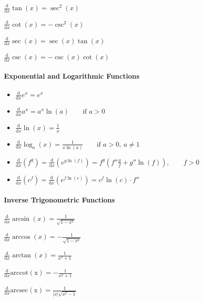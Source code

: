 $
\frac{\mathrm{d}}{\mathrm{d}x}\tan(x)=\sec^2(x)
$



$
\frac{\mathrm{d}}{\mathrm{d}x}\cot(x)=-\csc^2(x)
$



$
\frac{\mathrm{d}}{\mathrm{d}x}\sec(x)=\sec(x)\tan(x)
$



$
\frac{\mathrm{d}}{\mathrm{d}x}\csc(x)=-\csc(x)\cot(x)
$
\paragraph{Exponential and Logarithmic Functions}



\begin{itemize}
    \item $\frac{\mathrm{d}}{\mathrm{d}x}e^x=e^x$
    \item $\frac{\mathrm{d}}{\mathrm{d}x}a^x=a^x\ln(a)\qquad\text{if }a>0$
    \item $\frac{\mathrm{d}}{\mathrm{d}x}\ln(x)=\frac{1}{x}$
    \item $\frac{\mathrm{d}}{\mathrm{d}x}\log_a(x)=\frac{1}{x\ln(a)}\qquad\text{if }a>0,\ a\ne1$
    \item $\frac{\mathrm{d}}{\mathrm{d}x}(f^g)=\frac{\mathrm{d}}{\mathrm{d}x}\left(e^{g\ln(f)}\right)=f^g\left(f''\frac{g}{f}+g''\ln(f)\right),\qquad f>0$
    \item $\frac{\mathrm{d}}{\mathrm{d}x}(c^f)=\frac{\mathrm{d}}{\mathrm{d}x}\left(e^{f\ln(c)}\right)=c^f\ln(c)\cdot f''$
\end{itemize}

\paragraph{Inverse Trigonometric Functions}
$
\frac{\mathrm{d}}{\mathrm{d}x}\arcsin(x)=\frac{1}{\sqrt{1-x^2}}
$



$
\frac{\mathrm{d}}{\mathrm{d}x}\arccos(x)=-\frac{1}{\sqrt{1-x^2}}
$



$
\frac{\mathrm{d}}{\mathrm{d}x}\arctan(x)=\frac{1}{x^2+1}
$



$
\frac{\mathrm{d}}{\mathrm{d}x}\operatorname{arccot(x)}=-\frac{1}{x^2+1}
$



$
\frac{\mathrm{d}}{\mathrm{d}x}\operatorname{arcsec(x)}=\frac{1}{|x|\sqrt{x^2-1}}
$



